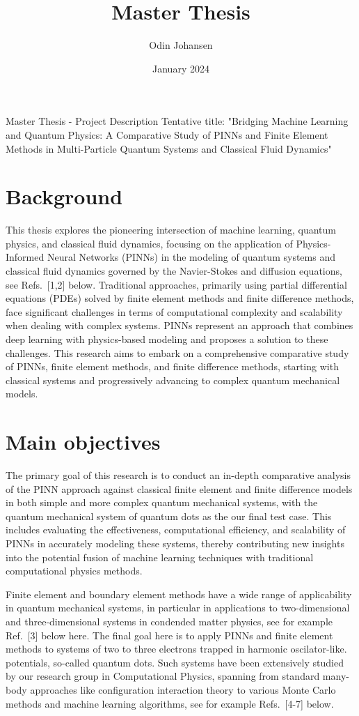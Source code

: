 \documentclass{article}
\title{Master Thesis}
\author{Odin Johansen}
\date{January 2024}
\begin{document}
\maketitle  

Master Thesis - Project Description
Tentative title: "Bridging Machine Learning and Quantum Physics: A Comparative Study of PINNs and Finite Element Methods in Multi-Particle Quantum Systems and Classical Fluid Dynamics"

\section{Background}

This thesis explores the pioneering intersection of machine learning,
quantum physics, and classical fluid dynamics, focusing on the
application of Physics-Informed Neural Networks (PINNs) in the
modeling of quantum systems and classical fluid dynamics governed by
the Navier-Stokes and diffusion equations, see Refs.~[1,2] below.  Traditional approaches,
primarily using partial differential equations (PDEs) solved by finite
element methods and finite difference methods, face significant
challenges in terms of computational complexity and scalability when
dealing with complex systems.  PINNs represent an approach that combines
deep learning with physics-based modeling and proposes a solution to these
challenges. This research aims to embark on a comprehensive
comparative study of PINNs, finite element methods, and finite
difference methods, starting with classical systems and progressively
advancing to complex quantum mechanical models.

\section{Main objectives}

The primary goal of this research is to conduct an in-depth
comparative analysis of the PINN approach against classical finite
element and finite difference models in both simple and more complex
quantum mechanical systems, with the quantum mechanical system of quantum dots as the
our final test case.  This includes evaluating the effectiveness, computational
efficiency, and scalability of PINNs in accurately modeling these
systems, thereby contributing new insights into the potential fusion
of machine learning techniques with traditional computational physics
methods.

Finite element and boundary element methods have a wide range of
applicability in quantum mechanical systems, in particular in
applications to two-dimensional and three-dimensional systems in
condended matter physics, see for example Ref.~[3] below here.  The
final goal here is to apply PINNs and finite element methods to
systems of two to three electrons trapped in harmonic oscilator-like.
potentials, so-called quantum dots. Such systems have been extensively studied by our research
group in Computational Physics, spanning from standard many-body
approaches like configuration interaction theory to various Monte
Carlo methods and machine learning algorithms, see for example Refs.~[4-7] below.
\end{document}

